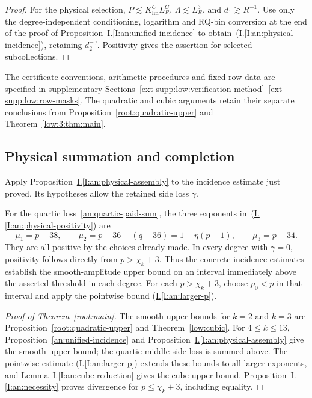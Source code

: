 \documentclass[11pt]{amsart}
\theoremstyle{definition}
\theoremstyle{remark}
\numberwithin{equation}{section}
\newcommand{\partIref}[1]{\hyperref[I:#1]{I.\ref*{I:#1}}}
\newcommand{\partIeqref}[1]{\textup{(\partIref{#1})}}
\begin{document}
\begin{proof}
For the physical selection, $P\lesssim K_{\mathrm{lin}}^CL_R^C$, $\Lambda\lesssim L_R^3$, and $d_1\gtrsim R^{-1}$. Use only the degree-independent conditioning, logarithm and RQ-bin conversion at the end of the proof of Proposition~\partIref{an:unified-incidence} to obtain~\partIeqref{an:physical-incidence}, retaining $d_2^{-\gamma}$. Positivity gives the assertion for selected subcollections.
\end{proof}

The certificate conventions, arithmetic procedures and fixed row data are specified in supplementary Sections~\ref{ext-supp:low:verification-method}--\ref{ext-supp:low:row-masks}. The quadratic and cubic arguments retain their separate conclusions from Proposition~\ref{root:quadratic-upper} and Theorem~\ref{low:3:thm:main}.

\subsection{Physical summation and completion}\label{completion:physical-II}

Apply Proposition~\partIref{an:physical-assembly} to the incidence estimate just proved. Its hypotheses allow the retained side loss $\gamma$.

For the quartic loss~\eqref{an:quartic-paid-sum}, the three exponents in~\partIeqref{an:physical-positivity} are
\[
\mu_1=p-38,\qquad \mu_2=p-36-(q-36)=1-\eta(p-1),\qquad \mu_3=p-34.
\]
They are all positive by the choices already made. In every degree with $\gamma=0$, positivity follows directly from $p>\chi_k+3$. Thus the concrete incidence estimates establish the smooth-amplitude upper bound on an interval immediately above the asserted threshold in each degree. For each $p>\chi_k+3$, choose $p_0<p$ in that interval and apply the pointwise bound \partIeqref{an:larger-p}.

\begin{proof}[Proof of Theorem~\ref{root:main}]\label{an:main-proof}
The smooth upper bounds for $k=2$ and $k=3$ are Proposition~\ref{root:quadratic-upper} and Theorem~\ref{low:cubic}. For $4\le k\le13$, Proposition~\ref{an:unified-incidence} and Proposition~\partIref{an:physical-assembly} give the smooth upper bound; the quartic middle-side loss is summed above. The pointwise estimate \partIeqref{an:larger-p} extends these bounds to all larger exponents, and Lemma~\partIref{an:cube-reduction} gives the cube upper bound. Proposition~\partIref{an:necessity} proves divergence for $p\le\chi_k+3$, including equality.
\end{proof}
\appendix
\end{document}
